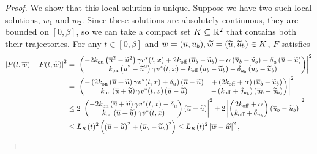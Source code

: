 \begin{proof}
    We show that this local solution is unique. Suppose we have two such local solutions, $w_1$ and $w_2$. Since these solutions are absolutely continuous, they are bounded on $[0, \beta]$, so we can take a compact set $K \subseteq \mathbb{R}^2$ that contains both their trajectories. For any $t \in [0, \beta]$ and $\overline{w} = (\overline{u}, \overline{u}_b), \widetilde{w} = (\widetilde{u}, \widetilde{u}_b) \in K$, $F$ satisfies
%
    \begin{equation*}
    \begin{aligned}
        \left|F(t, \overline{w}) - F(t, \widetilde{w})\right|^2 &= \left| \begin{pmatrix}
            -2 k_\text{on} \left(\overline{u}^2 - \widetilde{u}^2\right) \gamma v^*(t, x) + 2 k_\text{off} \left(\overline{u}_b - \widetilde{u}_b\right) + \alpha \left(\overline{u}_b - \widetilde{u}_b\right) - \delta_u \left(\overline{u} - \widetilde{u}\right) \\
            k_\text{on} \left(\overline{u}^2 - \widetilde{u}^2\right) \gamma v^*(t, x) - k_\text{off} \left(\overline{u}_b - \widetilde{u}_b\right) - \delta_{u_b} \left(\overline{u}_b - \widetilde{u}_b\right) \\
        \end{pmatrix} \right|^2 \\
        &= \left| \begin{pmatrix}
            - \left(2 k_\text{on} \left(\overline{u} + \widetilde{u}\right) \gamma v^*(t, x) + \delta_u\right) \left(\overline{u} - \widetilde{u}\right) & + \left(2 k_\text{off} + \alpha\right)\left(\overline{u}_b - \widetilde{u}_b\right) \\
            k_\text{on} \left(\overline{u} + \widetilde{u}\right) \gamma v^*(t, x) \left(\overline{u} - \widetilde{u}\right) & - \left(k_\text{off} + \delta_{u_b}\right) \left(\overline{u}_b - \widetilde{u}_b\right) \\
        \end{pmatrix} \right|^2 \\
        &\leq 2 \left| \begin{pmatrix}
            - 2 k_\text{on} \left(\overline{u} + \widetilde{u}\right) \gamma v^*(t, x) - \delta_u \\
            k_\text{on} \left(\overline{u} + \widetilde{u}\right) \gamma v^*(t, x)
        \end{pmatrix} \left(\overline{u} - \widetilde{u}\right) \right|^2 + 2 \left| \begin{pmatrix}
            2 k_\text{off} + \alpha \\
            k_\text{off} + \delta_{u_b}
        \end{pmatrix} \left(\overline{u}_b - \widetilde{u}_b\right) \right|^2 \\
        &\leq L_K(t)^2 \left(\left(\overline{u} - \widetilde{u}\right)^2 + \left(\overline{u}_b - \widetilde{u}_b\right)^2\right) \leq L_K(t)^2 \left|\overline{w} - \widetilde{w}\right|^2,
    \end{aligned}
    \end{equation*}


\end{proof}
